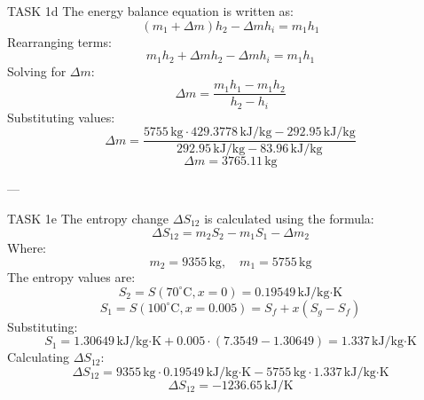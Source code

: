 TASK 1d  
The energy balance equation is written as:  
\[
(m_1 + \Delta m) h_2 - \Delta m h_i = m_1 h_1
\]  
Rearranging terms:  
\[
m_1 h_2 + \Delta m h_2 - \Delta m h_i = m_1 h_1
\]  
Solving for \( \Delta m \):  
\[
\Delta m = \frac{m_1 h_1 - m_1 h_2}{h_2 - h_i}
\]  
Substituting values:  
\[
\Delta m = \frac{5755 \, \text{kg} \cdot 429.3778 \, \text{kJ/kg} - 292.95 \, \text{kJ/kg}}{292.95 \, \text{kJ/kg} - 83.96 \, \text{kJ/kg}}
\]  
\[
\Delta m = 3765.11 \, \text{kg}
\]  

---

TASK 1e  
The entropy change \( \Delta S_{12} \) is calculated using the formula:  
\[
\Delta S_{12} = m_2 S_2 - m_1 S_1 - \Delta m_2
\]  
Where:  
\[
m_2 = 9355 \, \text{kg}, \quad m_1 = 5755 \, \text{kg}
\]  
The entropy values are:  
\[
S_2 = S(70^\circ\text{C}, x=0) = 0.19549 \, \text{kJ/kg·K}
\]  
\[
S_1 = S(100^\circ\text{C}, x=0.005) = S_f + x(S_g - S_f)
\]  
Substituting:  
\[
S_1 = 1.30649 \, \text{kJ/kg·K} + 0.005 \cdot (7.3549 - 1.30649) = 1.337 \, \text{kJ/kg·K}
\]  
Calculating \( \Delta S_{12} \):  
\[
\Delta S_{12} = 9355 \, \text{kg} \cdot 0.19549 \, \text{kJ/kg·K} - 5755 \, \text{kg} \cdot 1.337 \, \text{kJ/kg·K}
\]  
\[
\Delta S_{12} = -1236.65 \, \text{kJ/K}
\]  

